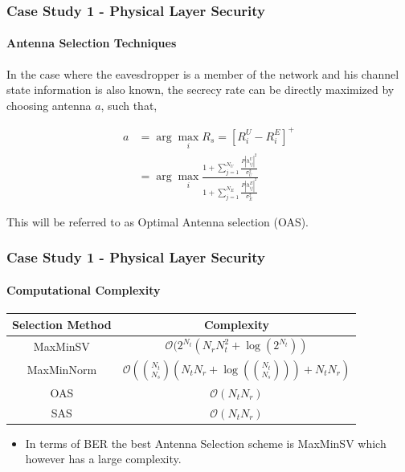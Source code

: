 \documentclass{beamer}
\begin{document}
    
\begin{frame}
    \frametitle{Case Study 1 - Physical Layer Security}
	\framesubtitle{Antenna Selection Techniques}
    
    In the case where the eavesdropper is a member of the network and his channel state information is also known, the secrecy rate can be directly maximized by choosing antenna $a$, such that, 
    
    \begin{align}
     a &= \arg\max_i R_s  = \left[R_i^U - R_i^E \right]^+ \\
     &= \arg\max_i \frac{1 + \sum_{j=1}^{N_U} \frac{P \left| h_{ij}^U \right|^2}{\sigma_U^2}}{1 + \sum_{j=1}^{N_E} \frac{P \left| h_{ij}^E \right|^2}{\sigma_E^2}}
    \end{align}
    
    This will be referred to as Optimal Antenna selection (OAS).


\end{frame}


\begin{frame}
    \frametitle{Case Study 1 - Physical Layer Security}
    \framesubtitle{Computational Complexity}
    
    \begin{table}
    \centering
        \begin{tabular}{c|c}
            Selection Method  & Complexity  \\[5pt]
            \hline
            MaxMinSV & $\mathcal{O}(2^{N_t}(N_r N_t^2 + \log(2^{N_t}))$ \\[5pt]
            MaxMinNorm & $\mathcal{O}(\binom{N_t}{N_s}(N_tN_r + \log(\binom{N_t}{N_s})) + N_tN_r)$ \\[5pt]
            OAS & $\mathcal{O}(N_tN_r)$ \\[5pt]
            SAS & $\mathcal{O}(N_tN_r)$ 
        \end{tabular}
    \end{table}
    
   \begin{itemize}
       \item In terms of BER the best Antenna Selection scheme is MaxMinSV which however has a large complexity.
   \end{itemize}
\end{frame}
\end{document}
